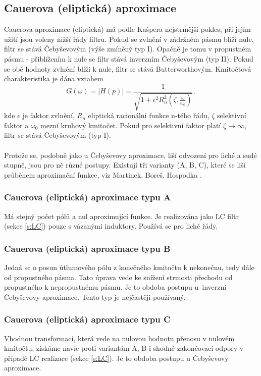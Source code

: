 \subsection{Cauerova (eliptická) aproximace}
\noindent Cauerova aproximace (eliptická) má podle Kašpera \cite{7} nejstrmější pokles, při jejím užití jsou voleny nižší řády filtru. Pokud se zvlnění v zádržném pásmu blíží nule, filtr se stává Čebyševovým (výše zmíněný typ I). Opačně je tomu v propustném pásmu - přiblížením k nule se filtr stává inverzním Čebyševovým (typ II).  Pokud se obě hodnoty zvlnění blíží k nule, filtr se stává Butterworthovým. Kmitočtová charakteristika je dána vztahem
\begin{equation}
G(\omega) = |H(p)| = \frac{1}{\sqrt{1 + \epsilon ^2 R_n ^2(\zeta, \frac{\omega}{\omega _0})}},
\end{equation}
kde $\epsilon$ je faktor zvlnění, $R_n$ eliptická racionální funkce n-tého řádu, $\zeta$ selektivní faktor a $\omega _0$ mezní kruhový kmitočet. Pokud pro selektivní faktor platí $\zeta \rightarrow \infty$, filtr se stává Čebyševovým (typ I).\\
\\
Protože se, podobně jako u Čebyševovy aproximace, liší odvození pro liché a sudé stupně, jsou pro ně různé postupy. Existují tři varianty (A, B, C), které se liší průběhem aproximační funkce, viz Martinek, Boreš, Hospodka \cite{12}.
\subsubsection{Cauerova (eliptická) aproximace typu A}
Má stejný počet pólů a nul aproximující funkce. Je realizována jako LC filtr (sekce \ref{s:LC}) pouze s vázanými induktory. Používá se pro liché řády.
\subsubsection{Cauerova (eliptická) aproximace typu B}
Jedná se o posun útlumového pólu z konečného kmitočtu k nekonečnu, tedy dále od propustného pásma. Tato úprava vede ke snížení strmosti přechodu od propustného k nepropustnému pásmu. Je to obdoba postupu u~inverzní Čebyševovy aproximace. Tento typ je nejčastěji používaný.
\subsubsection{Cauerova (eliptická) aproximace typu C}
Vhodnou transformací, která vede na nulovou hodnotu přenosu v nulovém kmitočtu, získáme navíc proti variantám A, B i shodné zakončovací odpory v případě LC realizace (sekce \ref{s:LC}). Je to obdoba postupu u Čebyševovy aproximace.
